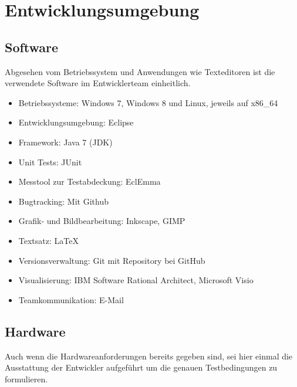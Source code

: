 \documentclass[10pt]{scrreprt}
\begin{document}
\chapter{Entwicklungsumgebung}
\section{Software}
Abgesehen vom Betriebssystem und Anwendungen wie Texteditoren ist die verwendete Software im Entwicklerteam einheitlich.
\begin{itemize}
\item Betriebssysteme: Windows 7, Windows 8 und Linux, jeweils auf x86{\_}64
\item Entwicklungsumgebung: Eclipse
\item Framework: Java 7 (JDK)
\item Unit Tests: JUnit
\item Messtool zur Testabdeckung: EclEmma
\item Bugtracking: Mit Github
\item Grafik- und Bildbearbeitung: Inkscape, GIMP
\item Textsatz: \LaTeX
\item Versionsverwaltung: Git mit Repository bei GitHub
\item Visualisierung: IBM Software Rational Architect, Microsoft Visio
\item Teamkommunikation: E-Mail
\end{itemize}

\vspace{5mm}
\section{Hardware}
Auch wenn die Hardwareanforderungen bereits gegeben sind, sei hier einmal die Ausstattung der Entwickler aufgeführt um die genauen Testbedingungen zu formulieren.

\vspace{0.5cm}
\end{document}
